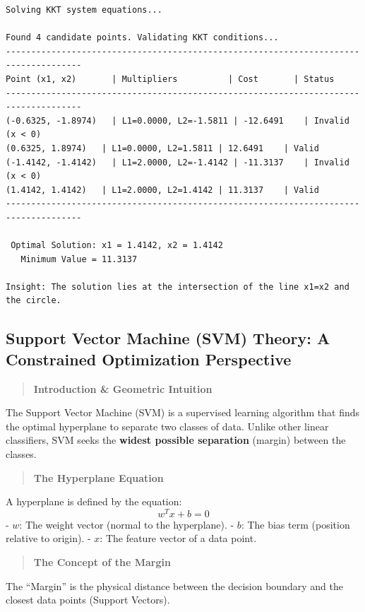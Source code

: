 \documentclass[
  letterpaper,
  DIV=11,
  numbers=noendperiod]{scrreprt}
\begin{document}
\begin{verbatim}
Solving KKT system equations...

Found 4 candidate points. Validating KKT conditions...
-------------------------------------------------------------------------------------
Point (x1, x2)       | Multipliers          | Cost       | Status
-------------------------------------------------------------------------------------
(-0.6325, -1.8974)   | L1=0.0000, L2=-1.5811 | -12.6491    | Invalid (x < 0)
(0.6325, 1.8974)   | L1=0.0000, L2=1.5811 | 12.6491    | Valid
(-1.4142, -1.4142)   | L1=2.0000, L2=-1.4142 | -11.3137    | Invalid (x < 0)
(1.4142, 1.4142)   | L1=2.0000, L2=1.4142 | 11.3137    | Valid
-------------------------------------------------------------------------------------

 Optimal Solution: x1 = 1.4142, x2 = 1.4142
   Minimum Value = 11.3137

Insight: The solution lies at the intersection of the line x1=x2 and the circle.
\end{verbatim}

\subsection{Support Vector Machine (SVM) Theory: A Constrained
Optimization
Perspective}\label{support-vector-machine-svm-theory-a-constrained-optimization-perspective}

\begin{quote}
\textbf{Introduction \& Geometric Intuition}
\end{quote}

The Support Vector Machine (SVM) is a supervised learning algorithm that
finds the optimal hyperplane to separate two classes of data. Unlike
other linear classifiers, SVM seeks the \textbf{widest possible
separation} (margin) between the classes.

\begin{quote}
\textbf{The Hyperplane Equation}
\end{quote}

A hyperplane is defined by the equation: \[w^T x + b = 0\] - \(w\): The
weight vector (normal to the hyperplane). - \(b\): The bias term
(position relative to origin). - \(x\): The feature vector of a data
point.

\begin{quote}
\textbf{The Concept of the Margin}
\end{quote}

The ``Margin'' is the physical distance between the decision boundary
and the closest data points (Support Vectors).
\end{document}
